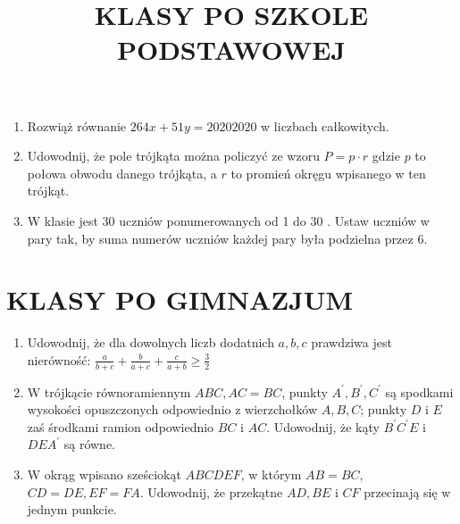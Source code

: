 \documentclass[10pt]{article}
\title{KLASY PO SZKOLE PODSTAWOWEJ }
\author{}
\date{}
\begin{document}
\maketitle
\begin{enumerate}
  \item Rozwiąż równanie \(264 x+51 y=20202020\) w liczbach całkowitych.
  \item Udowodnij, że pole trójkąta można policzyć ze wzoru \(P=p \cdot r\) gdzie \(p\) to połowa obwodu danego trójkąta, a \(r\) to promień okręgu wpisanego w ten trójkąt.
  \item W klasie jest 30 uczniów ponumerowanych od 1 do 30 . Ustaw uczniów w pary tak, by suma numerów uczniów każdej pary była podzielna przez 6.
\end{enumerate}

\section*{KLASY PO GIMNAZJUM}
\begin{enumerate}
  \item Udowodnij, że dla dowolnych liczb dodatnich \(a, b, c\) prawdziwa jest nierówność: \(\frac{a}{b+c}+\frac{b}{a+c}+\frac{c}{a+b} \geq \frac{3}{2}\)
  \item W trójkącie równoramiennym \(A B C, A C=B C\), punkty \(A^{\prime}, B^{\prime}, C^{\prime}\) są spodkami wysokości opuszczonych odpowiednio z wierzchołków \(A, B, C\); punkty \(D\) i \(E\) zaś środkami ramion odpowiednio \(B C\) i \(A C\). Udowodnij, że kąty \(B^{\prime} C^{\prime} E\) i \(D E A^{\prime}\) są równe.
  \item W okrąg wpisano sześciokąt \(A B C D E F\), w którym \(A B=B C\), \(C D=D E, E F=F A\). Udowodnij, że przekątne \(A D, B E\) i \(C F\) przecinają się w jednym punkcie.
\end{enumerate}
\end{document}
